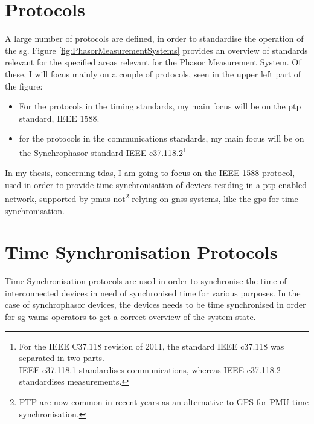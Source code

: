 \section{Protocols}
A large number of protocols are defined, in order to standardise the operation of the \acrlong{sg}.
Figure \ref{fig:PhasorMeasurementSystems} provides an overview of standards relevant for the specified areas relevant for the Phasor Measurement System.
Of these, I will focus mainly on a couple of protocols, seen in the upper left part of the figure:
\begin{itemize}
    \item For the protocols in the timing standards, my main focus will be on the \acrfull{ptp} standard, IEEE 1588.
    \item for the protocols in the communications standards, my main focus will be on the Synchrophasor standard IEEE c37.118.2\footnote{For the IEEE C37.118 revision of 2011, the standard IEEE c37.118 was separated in two parts.\\ IEEE c37.118.1 standardises communications, whereas IEEE c37.118.2 standardises measurements.}
\end{itemize}
 In my thesis, concerning \acrlong{tda}s, I am going to focus on the IEEE 1588 protocol, used in order to provide time synchronisation of devices residing in a \acrlong{ptp}-enabled network, supported by \acrshort{pmu}s not\footnote{PTP are now common in recent years as an alternative to GPS for PMU time synchronisation.} relying on \acrfull{gnss} systems, like the \acrfull{gps} for time synchronisation.













\section{Time Synchronisation Protocols}


Time Synchronisation protocols are used in order to synchronise the time of interconnected devices in need of synchronised time for various purposes. In the case of synchrophasor devices, the devices needs to be time synchronised in order for \acrshort{sg} \acrshort{wams} operators to get a correct overview of the system state.

